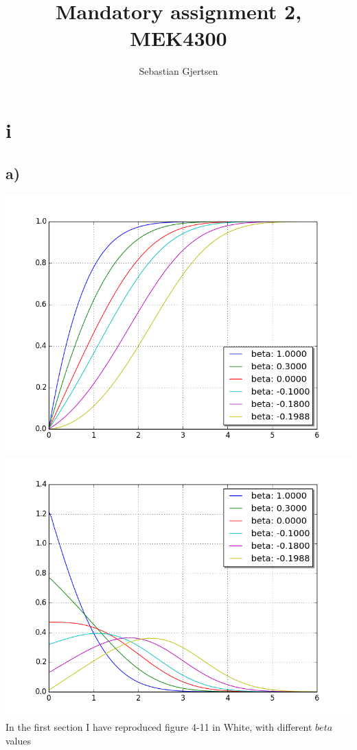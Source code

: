 \documentclass[a4paper,norsk]{article}
\title{Mandatory assignment 2, MEK4300}
\author{Sebastian Gjertsen}
\begin{document}
\maketitle
\section*{i}
\subsection*{a)}
\includegraphics[trim = 0mm 0mm 0mm 0mm, clip, scale=0.3]{f_derivative.png} 
\includegraphics[trim = 0mm 0mm 0mm 0mm, clip, scale=0.3]{f_double_derivative.png} 
In the first section I have reproduced figure 4-11 in White, with different $beta$ values
\end{document}
